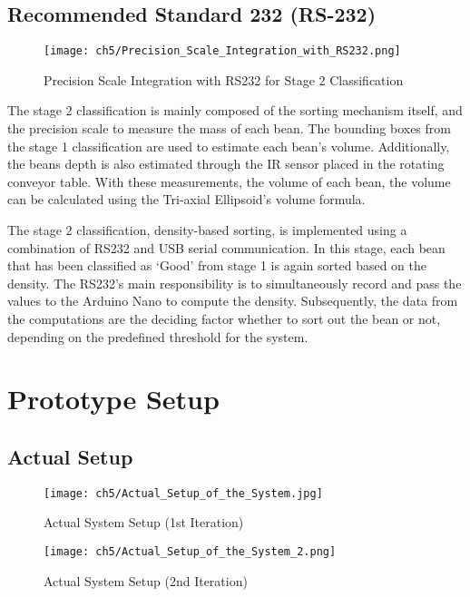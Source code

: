 \subsection{Recommended Standard 232 (RS-232)}
\begin{figure}[H]
    \centering
    \texttt{[image: ch5/Precision\_Scale\_Integration\_with\_RS232.png]}
    \caption{Precision Scale Integration with RS232 for Stage 2 Classification}
    \label{fig:rs232}
\end{figure}

The stage 2 classification is mainly composed of the sorting mechanism itself, and the precision scale to measure the mass of each bean. The bounding boxes from the stage 1 classification are used to estimate each bean’s volume. Additionally, the beans depth is also estimated through the IR sensor placed in the rotating conveyor table. With these measurements, the volume of each bean, the volume can be calculated using the Tri-axial Ellipsoid’s volume formula. 

The stage 2 classification, density-based sorting, is implemented using a combination of RS232 and USB serial communication. In this stage, each bean that has been classified as ‘Good’ from stage 1 is again sorted based on the density. The RS232’s main responsibility is to simultaneously record and pass the values to the Arduino Nano to compute the density. Subsequently, the data from the computations are the deciding factor whether to sort out the bean or not, depending on the predefined threshold for the system. 

\section{Prototype Setup}
\subsection{Actual Setup}

\begin{figure}[H]
    \centering
    \texttt{[image: ch5/Actual\_Setup\_of\_the\_System.jpg]}
    \caption{Actual System Setup (1st Iteration)}
    \label{fig:actual_setup_v1}
\end{figure}

\begin{figure}[H]
    \centering
    \texttt{[image: ch5/Actual\_Setup\_of\_the\_System\_2.png]}
    \caption{Actual System Setup (2nd Iteration)}
    \label{fig:actual_setup_v2}
\end{figure}

